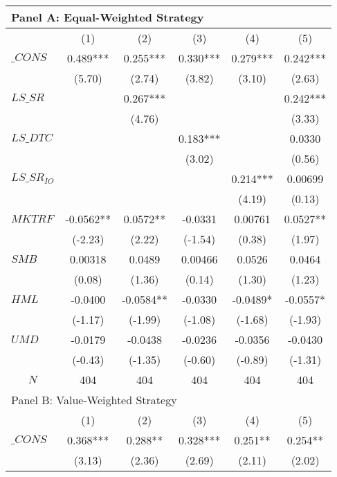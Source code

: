 \begin{tabular}{lccccc}
\hline
\hline
\multicolumn{6}{l}{Panel A: Equal-Weighted Strategy} \bigstrut\\
\hline
        & (1)     & (2)     & (3)     & (4)     & (5) \bigstrut\\
\hline
$\_CONS$ & 0.489*** & 0.255*** & 0.330*** & 0.279*** & 0.242*** \bigstrut[t]\\
        & (5.70)  & (2.74)  & (3.82)  & (3.10)  & (2.63) \\
$LS\_SR$ &         & 0.267*** &         &         & 0.242*** \\
        &         & (4.76)  &         &         & (3.33) \\
$LS\_DTC$ &         &         & 0.183*** &         & 0.0330 \\
        &         &         & (3.02)  &         & (0.56) \\
$LS\_SR_{IO}$ &         &         &         & 0.214*** & 0.00699 \\
        &         &         &         & (4.19)  & (0.13) \\
$MKTRF$ & -0.0562** & 0.0572** & -0.0331 & 0.00761 & 0.0527** \\
        & (-2.23) & (2.22)  & (-1.54) & (0.38)  & (1.97) \\
$SMB$   & 0.00318 & 0.0489  & 0.00466 & 0.0526  & 0.0464 \\
        & (0.08)  & (1.36)  & (0.14)  & (1.30)  & (1.23) \\
$HML$   & -0.0400 & -0.0584** & -0.0330 & -0.0489* & -0.0557* \\
        & (-1.17) & (-1.99) & (-1.08) & (-1.68) & (-1.93) \\
$UMD$   & -0.0179 & -0.0438 & -0.0236 & -0.0356 & -0.0430 \\
\multicolumn{1}{c}{} & (-0.43) & (-1.35) & (-0.60) & (-0.89) & (-1.31) \bigstrut[b]\\
\hline
\multicolumn{1}{c}{$N$} & 404     & 404     & 404     & 404     & 404 \bigstrut\\
\hline
\multicolumn{6}{l}{Panel B: Value-Weighted Strategy} \bigstrut\\
\hline
        & (1)     & (2)     & (3)     & (4)     & (5) \bigstrut\\
\hline
$\_CONS$ & 0.368*** & 0.288** & 0.328*** & 0.251** & 0.254** \bigstrut[t]\\
        & (3.13)  & (2.36)  & (2.69)  & (2.11)  & (2.02) \\

\end{tabular}
